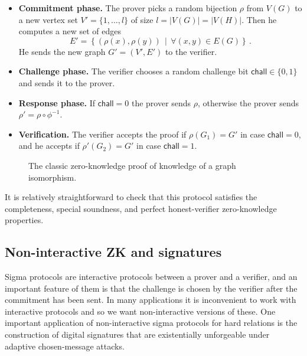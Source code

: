 \documentclass{llncs}
\newcommand{\chall}{\mathsf{chall}}
\begin{document}
\begin{itemize}
    \item {\bf Commitment phase.} The prover picks a random bijection $\rho$ from $V(G)$ to a new vertex set $V' = \{1,\dots,l\}$ of size $l = |V(G)| = |V(H)|$. Then he computes a new set of edges \[ E' = \left\{ (\rho(x),\rho(y)) \, \middle| \, \forall (x,y) \in E(G) \right\} \, . \] He sends the new graph $G' = (V',E')$ to the verifier.
    \item {\bf Challenge phase.} The verifier chooses a random challenge bit $\chall \in \{0,1\}$ and sends it to the prover.
    \item {\bf Response phase.} If $\chall = 0$ the prover sends $\rho$, otherwise the prover sends $\rho' = \rho \circ \phi^{-1}$. 
    \item {\bf Verification.} The verifier accepts the proof if $\rho(G_1) = G'$ in case $\chall = 0$, and he accepts if $\rho'(G_2) = G'$ in case $\chall = 1$. 
\end{itemize}

\begin{figure}
    \begin{center}
        \caption[Zero-Knowledge protocol for graph isomorphism]{%
          The classic zero-knowledge proof of knowledge of a graph isomorphism.
        }
        \label{fig:idscheme}
    \end{center}
\end{figure}

It is relatively straightforward to check that this protocol satisfies the completeness, special soundness, and perfect honest-verifier zero-knowledge properties.


\subsection{Non-interactive ZK and signatures}

Sigma protocols are interactive protocols between a prover and a verifier, and an important feature of them is that the challenge is chosen by the verifier after the commitment has been sent. In many applications it is inconvenient to work with interactive protocols and so we want non-interactive versions of these.
One important application of non-interactive sigma protocols for hard relations is the construction of digital signatures that are existentially unforgeable under adaptive chosen-message attacks.
\end{document}
